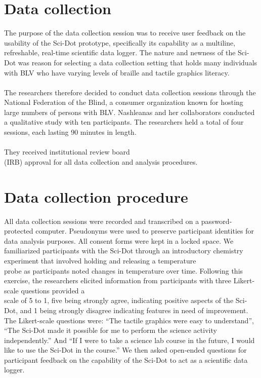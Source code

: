 \documentclass[11.5pt]{sig-alternate}
\begin{document}
\begin{large}
\section*{Data collection}

The purpose of the data collection session was to receive user feedback on the usability of the Sci-Dot prototype, specifically its capability as a multiline, refreshable, real-time scientific data logger. The nature and newness of the Sci-Dot was reason for selecting a data collection setting that holds many individuals with BLV who have varying levels of braille and tactile graphics literacy. 
\\\\The researchers therefore decided to conduct data collection sessions through the National Federation of the Blind, a consumer organization known for hosting large numbers of persons with BLV. Nashleanas and her collaborators conducted a qualitative study with ten participants. The researchers held a total of four sessions, each lasting 90 minutes in length.
\\\\They received institutional review board \\(IRB) approval for all data collection and analysis procedures. 

\section*{Data collection procedure}
All data collection sessions were recorded and transcribed on a password-protected computer. Pseudonyms were used to preserve participant identities for data analysis purposes. All consent forms were kept in a locked space. We familiarized participants with the Sci-Dot through an introductory chemistry experiment that involved holding and releasing a temperature\\ probe as participants noted changes in temperature over time. Following this exercise, the researchers elicited information from participants with three Likert-scale questions provided a\\ scale of 5 to 1, five being strongly agree, indicating positive aspects of the Sci-Dot, and 1 being strongly disagree indicating features in need of improvement. The Likert-scale questions were: “The tactile graphics were easy to understand”, “The Sci-Dot made it possible for me to perform the science activity independently.” And “If I were to take a science lab course in the future, I would like to use the Sci-Dot in the course.” We then asked open-ended questions for participant feedback on the capability of the Sci-Dot to act as a scientific data logger.

\end{large}
\end{document}
